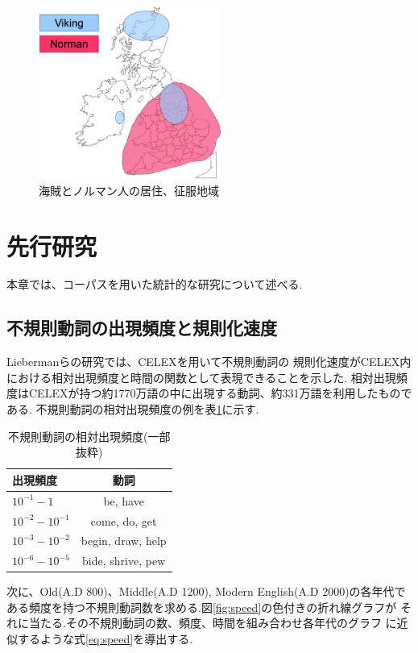 \documentclass[10.5pt, a4j, twocolumn]{jsarticle}
\begin{document}
\begin{figure}[htbp]
 \centering
 \includegraphics[width=6cm]{viking_nrman.eps}
 \caption{海賊とノルマン人の居住、征服地域\label{fig:viking_nrman}}
\end{figure}

\section{先行研究}\label{sec:relative_work}
本章では、コーパスを用いた統計的な研究について述べる.
\subsection{不規則動詞の出現頻度と規則化速度}
Liebermanらの研究\cite{Lieberman}では、CELEX\cite{celex}を用いて不規則動詞の
規則化速度がCELEX内における相対出現頻度と時間の関数として表現できることを示した.
相対出現頻度はCELEXが持つ約1770万語の中に出現する動詞、約331万語を利用したものである.
不規則動詞の相対出現頻度の例を表\ref{tab:freq}に示す.

{\small
\begin{table}[htbp]
 \centering
 \caption{不規則動詞の相対出現頻度(一部抜粋)\label{tab:freq}}
 \begin{tabular}{l|c}
  \hline
  出現頻度 & 動詞 \\
  \hline
  $10^{-1} - 1$ & be, have \\
  \hline
  $10^{-2} - 10^{-1}$ & come, do, get \\
  \hline
  $10^{-3} - 10^{-2}$ & begin, draw, help  \\
  \hline
  \hline
  $10^{-6} - 10^{-5}$ & bide, shrive, pew\\
  \hline
\end{tabular}
\end{table}
}

次に、Old(A.D 800)、Middle(A.D 1200), Modern English(A.D 2000)の各年代で
ある頻度を持つ不規則動詞数を求める.図\ref{fig:speed}の色付きの折れ線グラフが
それに当たる.その不規則動詞の数、頻度、時間を組み合わせ各年代のグラフ
に近似するような式\ref{eq:speed}を導出する.
\end{document}
